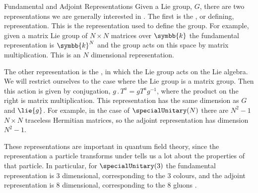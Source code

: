 \documentclass[fleqn]{NotesClass}
\renewcommand{\field}{\symbb{k}}
\newcommand{\action}{\mathbin{.}}
\begin{document}
    \begin{exm}{Fundamental and Adjoint Representations}{}
        Given a Lie group, \(G\), there are two representations we are generally interested in \cite[42]{allanach}.
        The first is the , or defining, representation.
        This is the representation used to define the group.
        For example, given a matrix Lie group of \(N \times N\) matrices over \(\field\) the fundamental representation is \(\field^N\) and the group acts on this space by matrix multiplication.
        This is an \(N\) dimensional representation.
        
        The other representation is the , in which the Lie group acts on the Lie algebra.
        We will restrict ourselves to the case where the Lie group is a matrix group.
        Then this action is given by conjugation, \(g \action T^a = gT^a g^{-1}\), where the product on the right is matrix multiplication.
        This representation has the same dimension as \(G\) and \(\lie{g}\).
        For example, in the case of \(\specialUnitary(N)\) there are \(N^2 - 1\) \(N \times N\) traceless Hermitian matrices, so the adjoint representation has dimension \(N^2 - 1\).
        
        These representations are important in quantum field theory, since the representation a particle transforms under tells us a lot about the properties of that particle.
        In particular, for \(\specialUnitary(3)\) the fundamental representation is 3 dimensional, corresponding to the 3 colours, and the adjoint representation is 8 dimensional, corresponding to the 8 gluons \cite[547]{peskin}.
    \end{exm}
    
\end{document}
